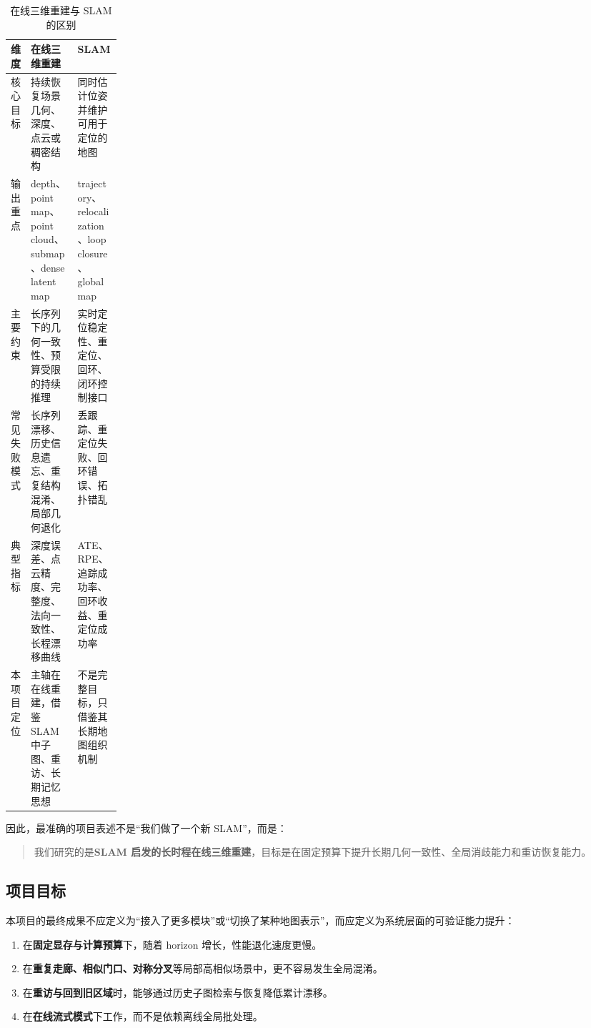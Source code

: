 \documentclass[12pt]{article}
\begin{document}
\begin{table}[H]
\centering
\caption{在线三维重建与 SLAM 的区别}
\label{tab:recon-vs-slam}
\begin{tabularx}{\linewidth}{>{\raggedright\arraybackslash}p{0.18\linewidth}XX}
\toprule
维度 & 在线三维重建 & SLAM \\
\midrule
核心目标 & 持续恢复场景几何、深度、点云或稠密结构 & 同时估计位姿并维护可用于定位的地图 \\
输出重点 & depth、point map、point cloud、submap、dense latent map & trajectory、relocalization、loop closure、global map \\
主要约束 & 长序列下的几何一致性、预算受限的持续推理 & 实时定位稳定性、重定位、回环、闭环控制接口 \\
常见失败模式 & 长序列漂移、历史信息遗忘、重复结构混淆、局部几何退化 & 丢跟踪、重定位失败、回环错误、拓扑错乱 \\
典型指标 & 深度误差、点云精度、完整度、法向一致性、长程漂移曲线 & ATE、RPE、追踪成功率、回环收益、重定位成功率 \\
本项目定位 & 主轴在在线重建，借鉴 SLAM 中子图、重访、长期记忆思想 & 不是完整目标，只借鉴其长期地图组织机制 \\
\bottomrule
\end{tabularx}
\end{table}

因此，最准确的项目表述不是“我们做了一个新 SLAM”，而是：
\begin{quote}
我们研究的是\textbf{SLAM 启发的长时程在线三维重建}，目标是在固定预算下提升长期几何一致性、全局消歧能力和重访恢复能力。
\end{quote}

\subsection{项目目标}

本项目的最终成果不应定义为“接入了更多模块”或“切换了某种地图表示”，而应定义为系统层面的可验证能力提升：
\begin{enumerate}
  \item 在\textbf{固定显存与计算预算}下，随着 horizon 增长，性能退化速度更慢。
  \item 在\textbf{重复走廊、相似门口、对称分叉}等局部高相似场景中，更不容易发生全局混淆。
  \item 在\textbf{重访与回到旧区域}时，能够通过历史子图检索与恢复降低累计漂移。
  \item 在\textbf{在线流式模式}下工作，而不是依赖离线全局批处理。
\end{enumerate}
\end{document}
